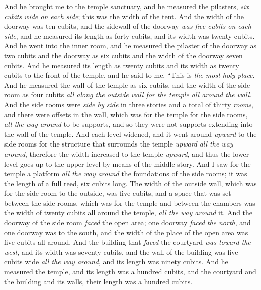 \begin{biblechapter} %
 And he brought me to the temple sanctuary, and he measured the pilasters, \textit{six cubits wide on each side}; this was the width of the tent.
\verse And the width of the doorway was ten cubits, and the sidewall of the doorway \textit{was five cubits on each side}, and he measured its length as forty cubits, and its width was twenty cubits.
\verse And he went into the inner room, and he measured the pilaster of the doorway as two cubits and the doorway as six cubits and the width of the doorway seven cubits.
\verse And he measured its length as twenty cubits and its width as twenty cubits to the front of the temple, and he said to me, “This is \textit{the most holy place}.
\verse And he measured the wall of the temple as six cubits, and the width of the side room as four cubits \textit{all along the outside wall for the temple all around the wall}.
\verse And the side rooms were \textit{side by side} in three stories and a total of thirty \textit{rooms}, and there were offsets in the wall, which was for the temple for the side rooms, \textit{all the way around} to be supports, and so they were not supports extending into the wall of the temple.
\verse And each level widened, and it went around \textit{upward} to the side rooms for the structure that surrounds the temple \textit{upward} \textit{all the way around}, therefore the width increased to the temple \textit{upward}, and thus the lower level goes up to the upper level by means of the middle story.
\verse And I saw for the temple a platform \textit{all the way around} the foundations of the side rooms; it was the length of a full reed, six cubits long.
\verse The width of the outside wall, which was for the side room to the outside, was five cubits, and a space that was set between the side rooms, which was for the temple
\verse and between the chambers was the width of twenty cubits all around the temple, \textit{all the way around} it.
\verse And the doorway of the side room \textit{faced} the open area; one doorway \textit{faced} \textit{the north}, and one doorway was to the south, and the width of the place of the open area was five cubits all around.
\verse And the building that \textit{faced} the courtyard \textit{was toward the west}, and its width was seventy cubits, and the wall of the building was five cubits wide \textit{all the way around}, and its length was ninety cubits.
\verse And he measured the temple, and its length was a hundred cubits, and the courtyard and the building and its walls, their length was a hundred cubits.

\end{biblechapter}
